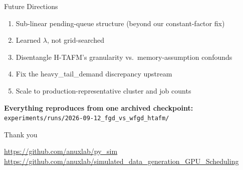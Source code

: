 \documentclass[aspectratio=169]{beamer}
\begin{document}
\begin{frame}{Future Directions}
\begin{enumerate}
  \item Sub-linear pending-queue structure (beyond our constant-factor fix)
  \item Learned $\lambda$, not grid-searched
  \item Disentangle H-TAFM's granularity vs.\ memory-assumption confounds
  \item Fix the heavy\_tail\_demand discrepancy upstream
  \item Scale to production-representative cluster and job counts
\end{enumerate}
\vspace{0.6cm}
\centering
\textbf{Everything reproduces from one archived checkpoint:}\\
\small \texttt{experiments/runs/2026-09-12\_fgd\_vs\_wfgd\_htafm/}
\end{frame}

\begin{frame}
\centering
\Huge Thank you
\vspace{0.5cm}

\normalsize\url{https://github.com/anuxlab/py_sim}\\
\url{https://github.com/anuxlab/simulated_data_generation_GPU_Scheduling}
\end{frame}
\end{document}

